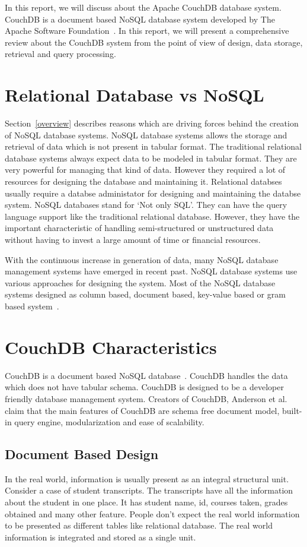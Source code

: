 \documentclass{sig-alternate}
\begin{document}
In this report, we will discuss about the Apache CouchDB database system. CouchDB is a document based NoSQL database system developed by The Apache Software Foundation~\cite{couchDB}. In this report, we will present a comprehensive review about the CouchDB system from the point of view of design, data storage, retrieval and query processing.

\section{Relational Database vs NoSQL}
\label{relational nosql}
Section~\ref{overview} describes reasons which are driving forces behind the creation of NoSQL database systems. NoSQL database systems allows the storage and retrieval of data which is not present in tabular format. The traditional relational database systems always expect data to be modeled in tabular format. They are very powerful for managing that kind of data. However they required a lot of resources for designing the database and maintaining it. Relational databses usually require a databse administator for designing and maintaining the databse system. NoSQL databases stand for `Not only SQL'. They can have the query language support like the traditional relational database. However, they have the important characteristic of handling semi-structured or unstructured data without having to invest a large amount of time or financial resources.

With the continuous increase in generation of data, many NoSQL database management systems have emerged in recent past. NoSQL database systems use various approaches for designing the system. Most of the NoSQL database systems designed as column based, document based, key-value based or gram based system~\cite{wikiTypes}.

\section{CouchDB Characteristics}
\label{couchdb characteristics}
CouchDB is a document based NoSQL database~\cite{Anderson:CouchDB}. CouchDB handles the data which does not have tabular schema. CouchDB is designed to be a developer friendly database management system. Creators of CouchDB, Anderson et al.~\cite{Anderson:CouchDB} claim that the main features of CouchDB are schema free document model, built-in query engine, modularization and ease of scalability.

\subsection{Document Based Design}
\label{document based design}
In the real world, information is usually present as an integral structural unit. Consider a case of student transcripts. The transcripts have all the information about the student in one place. It has student name, id, courses taken, grades obtained and many other feature. People don't expect the real world information to be presented as different tables like relational database. The real world information is integrated and stored as a single unit.
\end{document}
